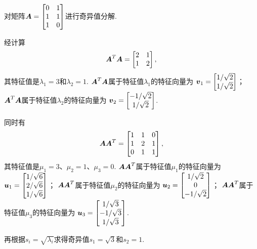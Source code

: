 \begin{example}
对矩阵\(\boldsymbol{A} = \begin{bmatrix} 0 & 1 \\ 1 & 1 \\ 1 & 0 \end{bmatrix}\)进行奇异值分解.
\begin{solution}
经计算\[
	\boldsymbol{A}^T \boldsymbol{A} = \begin{bmatrix} 2 & 1 \\ 1 & 2 \end{bmatrix},
\]
其特征值是\(\lambda_1 = 3\)和\(\lambda_2 = 1\).
\(\boldsymbol{A}^T \boldsymbol{A}\)属于特征值\(\lambda_1\)的特征向量为
\(\boldsymbol{v}_1 = \begin{bmatrix} 1/\sqrt{2} \\ 1/\sqrt{2} \end{bmatrix}\)；
\(\boldsymbol{A}^T \boldsymbol{A}\)属于特征值\(\lambda_2\)的特征向量为
\(\boldsymbol{v}_2 = \begin{bmatrix} -1/\sqrt{2} \\ 1/\sqrt{2} \end{bmatrix}\).

同时有\[
	\boldsymbol{A} \boldsymbol{A}^T = \begin{bmatrix} 1 & 1 & 0 \\ 1 & 2 & 1 \\ 0 & 1 & 1 \end{bmatrix},
\]
其特征值是\(\mu_1 = 3\)、\(\mu_2 = 1\)、\(\mu_3 = 0\).
\(\boldsymbol{A} \boldsymbol{A}^T\)属于特征值\(\mu_1\)的特征向量为
\(\boldsymbol{u}_1 = \begin{bmatrix} 1/\sqrt{6} \\ 2/\sqrt{6} \\ 1/\sqrt{6} \end{bmatrix}\)；
\(\boldsymbol{A} \boldsymbol{A}^T\)属于特征值\(\mu_2\)的特征向量为
\(\boldsymbol{u}_2 = \begin{bmatrix} 1/\sqrt{2} \\ 0 \\ -1/\sqrt{2} \end{bmatrix}\)；
\(\boldsymbol{A} \boldsymbol{A}^T\)属于特征值\(\mu_3\)的特征向量为
\(\boldsymbol{u}_3 = \begin{bmatrix} 1/\sqrt{3} \\ -1/\sqrt{3} \\ 1/\sqrt{3} \end{bmatrix}\).

再根据\(s_i = \sqrt{\lambda_i}\)求得奇异值\(s_1 = \sqrt{3}\)和\(s_2 = 1\).


\end{solution}
\end{example}

